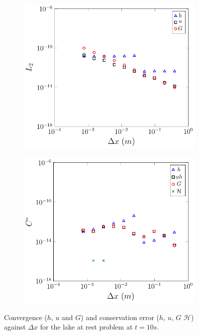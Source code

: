 \documentclass[times]{elsarticle}
\begin{document}
\begin{figure}
	\centering
	\begin{subfigure}{0.49\textwidth}
		\includegraphics[width=\textwidth]{./Figures/LakeAtRest/L2.pdf}
		\label{fig:LARL1}
		\vspace{0.5cm}
	\end{subfigure}
	\begin{subfigure}{0.49\textwidth}
		\includegraphics[width=\textwidth]{./Figures/LakeAtRest/C1num.pdf}
		\label{fig:LARC}
		\vspace{0.5cm}
	\end{subfigure}
	\caption{Convergence ($h$, $u$ and $G$) and conservation error ($h$, $u$, $G$ $\mathcal{H}$) against $\Delta x$ for the lake at rest problem at $t=10s$. }
	\label{fig:LARL2C}
\end{figure}
\end{document}
